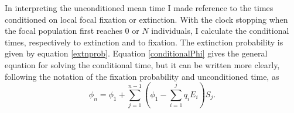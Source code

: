 In interpreting the unconditioned mean time I made reference to the times conditioned on local focal fixation or extinction. 
With the clock stopping when the focal population first reaches $0$ or $N$ individuals, I calculate the conditional times, respectively to extinction and to fixation. 
The extinction probability is given by equation \ref{extnprob}. 
Equation \ref{conditionalPhi} gives the general equation for solving the conditional time, but it can be written more clearly, following the notation of the fixation probability and unconditioned time, as
\begin{equation}
\phi_n = \phi_1 + \sum_{j=1}^{n-1}\left(\phi_1 - \sum_{i=1}^{j}q_iE_i\right)S_{j}.  
\end{equation} \label{conditionedphi}
